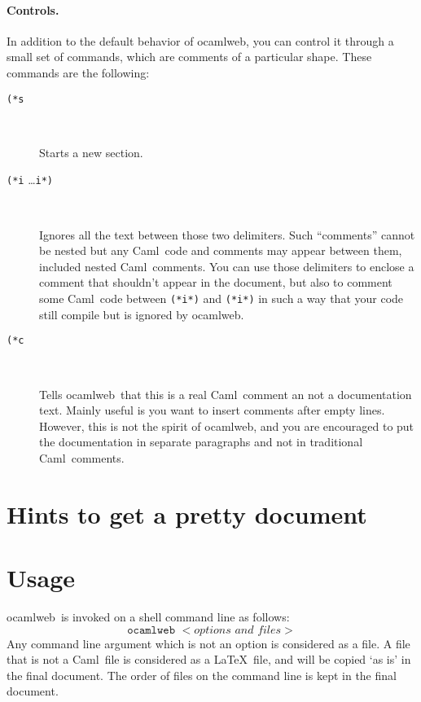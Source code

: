 \documentclass[12pt]{article}
\newcommand{\Caml}{\textsf{Caml}}
\newcommand{\ocamlweb}{\textsf{ocamlweb}}
\begin{document}
\paragraph{Controls.}
In addition to the default behavior of \ocamlweb, you can control it
through a small set of commands, which are comments of a particular
shape. These commands are the following:
\begin{description}

\item[\texttt{(*s}] ~\par
  
  Starts a new section.

\item[\texttt{(*i} \quad\dots\quad \texttt{i*)}] ~\par
  
  Ignores all the text between those two delimiters.  Such ``comments''
  cannot be nested but any \Caml\ code and comments may appear between
  them, included nested \Caml\ comments.  You can use those delimiters
  to enclose a comment that shouldn't appear in the document, but also
  to comment some \Caml\ code between \texttt{(*i*)} and
  \texttt{(*i*)} in such a way that your code still compile but is
  ignored by \ocamlweb.

\item[\texttt{(*c}] ~\par
  
  Tells \ocamlweb\ that this is a real \Caml\ comment an not a
  documentation text. Mainly useful is you want to insert comments
  after empty lines. However, this is not the spirit of \ocamlweb, and
  you are encouraged to put the documentation in separate paragraphs
  and not in traditional \Caml\ comments.

\end{description}


\section{Hints to get a pretty document}



\section{Usage}

\ocamlweb\ is invoked on a shell command line as follows:
\begin{displaymath}
  \texttt{ocamlweb }<\textit{options and files}>
\end{displaymath}
Any command line argument which is not an option is considered as a
file. A file that is not a \Caml\ file is considered as a \LaTeX\ file,
and will be copied `as is' in the final document. The order of files
on the command line is kept in the final document. 
\end{document}
